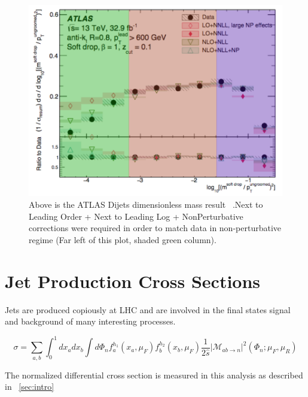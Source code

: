 \begin{figure}[htb]
\centering
\includegraphics[width=.60\textwidth]{visuals/ATLAS-rho-highorder.png}
\caption{Above is the ATLAS Dijets dimensionless mass result ~\cite{Dreyer:2018nbf}.Next to Leading Order + Next to Leading Log + NonPerturbative corrections were required in order to match data in non-perturbative regime (Far left of this plot, shaded green column).}
\label{fig:atlasDijet}
\end{figure}








\cite{Salam:2009jx}

\cite{Asquith:2018igt}



\section{Jet Production Cross Sections}\label{sec:jetProdCrossSections}

Jets are produced copiously at LHC and are involved in the final states signal and background of many interesting processes. 


\begin{equation}
\sigma=\sum_{a, b} \int_{0}^{1} d x_{a} d x_{b} \int d \Phi_{n} f_{a}^{h_{1}}\left(x_{a}, \mu_{F}\right) f_{b}^{h_{2}}\left(x_{b}, \mu_{F}\right) \frac{1}{2 \hat{s}}\left|\mathcal{M}_{a b \rightarrow n}\right|^{2}\left(\Phi_{n} ; \mu_{F}, \mu_{R}\right)
\end{equation}

The normalized differential cross section is measured in this analysis as described in ~\ref{sec:intro}

